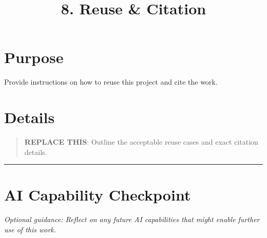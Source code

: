 \documentclass[
]{report}
\title{8. Reuse \& Citation}
\author{}
\date{}
\renewcommand*\contentsname{Table of contents}
\newcommand\contentsname{Table of contents}
\begin{document}
\maketitle

\renewcommand*\contentsname{Table of contents}
{
\hypersetup{linkcolor=}
\setcounter{tocdepth}{2}
\tableofcontents
}

\chapter{Purpose}\label{purpose}

Provide instructions on how to reuse this project and cite the work.

\chapter{Details}\label{details}

\begin{quote}
\textbf{REPLACE THIS}: Outline the acceptable reuse cases and exact
citation details.
\end{quote}

\begin{center}\rule{0.5\linewidth}{0.5pt}\end{center}

\chapter{AI Capability Checkpoint}\label{ai-capability-checkpoint}

\emph{Optional guidance: Reflect on any future AI capabilities that
might enable further use of this work.}
\end{document}
